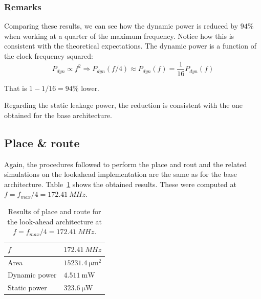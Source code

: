 \documentclass[a4paper]{article}
\begin{document}
\subsubsection{Remarks}

Comparing these results, we can see how the dynamic power is reduced by $94\%$ when working at a quarter of the maximum frequency. Notice how this is consistent with the theoretical expectations. The dynamic power is a function of the clock frequency squared:
\begin{equation*}
    P_{dyn} \propto f^2 \Rightarrow P_{dyn} \left( f/4 \right) \approx P_{dyn} \left( f \right) = \frac{1}{16} P_{dyn} \left( f \right)
\end{equation*}

That is $1-1/16 = 94\%$ lower. 

Regarding the static leakage power, the reduction is consistent with the one obtained for the base architecture.

\subsection{Place \& route}
Again, the procedures followed to perform the place and rout and the related simulations on the lookahead implementation are the same as for the base architecture. Table~\ref{tab:lookahead_post_pnr} shows the obtained results. These were computed at $f = f_{max}/4 = \SI{172.41}{MHz}$. 

\begin{table}[hbtp]
    \centering
    \begin{tabular}{l|l|}
    \hline
    \multicolumn{1}{|l|}{$f$}           & $\SI{172.41}{MHz}$                \\ \hline
    \multicolumn{1}{|l|}{Area}          & $\SI{15231.4}{\micro\meter^2}$    \\ \hline
    \multicolumn{1}{|l|}{Dynamic power} & $\SI{4.511}{\milli\watt}$        \\ \hline
    \multicolumn{1}{|l|}{Static power}  & $\SI{323.6}{\micro\watt}$          \\ \hline
    \end{tabular}
    \caption{Results of place and route for the look-ahead architecture at $f = f_{max}/4 = \SI{172.41}{MHz}$.}
    \label{tab:lookahead_post_pnr}
\end{table}
\end{document}
